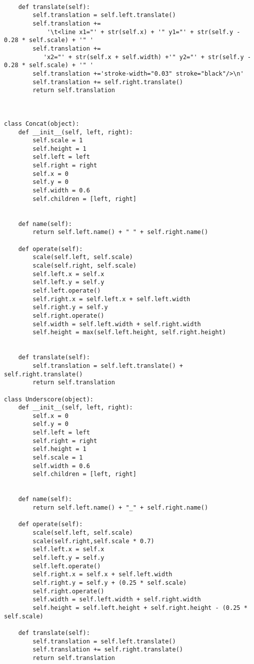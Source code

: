 \begin{verbatim}
        
    def translate(self):
        self.translation = self.left.translate()
        self.translation += 
            '\t<line x1="' + str(self.x) + '" y1="' + str(self.y - 0.28 * self.scale) + '" '
        self.translation += 
           'x2="' + str(self.x + self.width) +'" y2="' + str(self.y -  0.28 * self.scale) + '" '
        self.translation +='stroke-width="0.03" stroke="black"/>\n'
        self.translation += self.right.translate()
        return self.translation



class Concat(object):
    def __init__(self, left, right):
        self.scale = 1
        self.height = 1
        self.left = left
        self.right = right
        self.x = 0
        self.y = 0
        self.width = 0.6
        self.children = [left, right]
        

    def name(self):
        return self.left.name() + " " + self.right.name()

    def operate(self):
        scale(self.left, self.scale)
        scale(self.right, self.scale)
        self.left.x = self.x
        self.left.y = self.y
        self.left.operate()
        self.right.x = self.left.x + self.left.width
        self.right.y = self.y
        self.right.operate()
        self.width = self.left.width + self.right.width
        self.height = max(self.left.height, self.right.height)
        

    def translate(self):
        self.translation = self.left.translate() + self.right.translate()
        return self.translation

class Underscore(object):
    def __init__(self, left, right):
        self.x = 0
        self.y = 0
        self.left = left
        self.right = right
        self.height = 1
        self.scale = 1
        self.width = 0.6
        self.children = [left, right]
        

    def name(self):
        return self.left.name() + "_" + self.right.name()

    def operate(self):
        scale(self.left, self.scale)
        scale(self.right,self.scale * 0.7)
        self.left.x = self.x
        self.left.y = self.y
        self.left.operate()
        self.right.x = self.x + self.left.width
        self.right.y = self.y + (0.25 * self.scale)
        self.right.operate()
        self.width = self.left.width + self.right.width
        self.height = self.left.height + self.right.height - (0.25 * self.scale)

    def translate(self):
        self.translation = self.left.translate()
        self.translation += self.right.translate()
        return self.translation


\end{verbatim}
